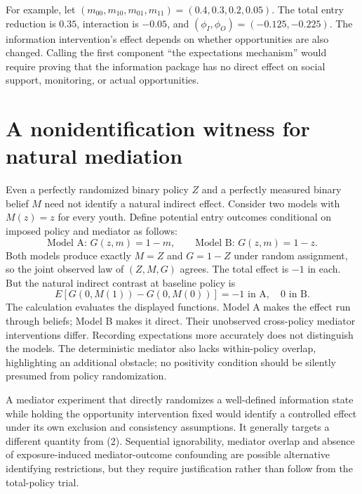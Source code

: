 \documentclass[11pt,a4paper]{article}
\begin{document}
For example, let $(m_{00},m_{10},m_{01},m_{11})=(0.4,0.3,0.2,0.05)$. The total entry reduction is $0.35$, interaction is $-0.05$, and $(\phi_I,\phi_O)=(-0.125,-0.225)$. The information intervention's effect depends on whether opportunities are also changed. Calling the first component ``the expectations mechanism'' would require proving that the information package has no direct effect on social support, monitoring, or actual opportunities.

\section{A nonidentification witness for natural mediation}
Even a perfectly randomized binary policy $Z$ and a perfectly measured binary belief $M$ need not identify a natural indirect effect. Consider two models with $M(z)=z$ for every youth. Define potential entry outcomes conditional on imposed policy and mediator as follows:
\[
 \text{Model A: }G(z,m)=1-m,\qquad
 \text{Model B: }G(z,m)=1-z.
\]
Both models produce exactly $M=Z$ and $G=1-Z$ under random assignment, so the joint observed law of $(Z,M,G)$ agrees. The total effect is $-1$ in each. But the natural indirect contrast at baseline policy is
\[
 E[G(0,M(1))-G(0,M(0))]=-1\text{ in A},\quad0\text{ in B}. \tag{2}
\]
The calculation evaluates the displayed functions. Model A makes the effect run through beliefs; Model B makes it direct. Their unobserved cross-policy mediator interventions differ. Recording expectations more accurately does not distinguish the models. The deterministic mediator also lacks within-policy overlap, highlighting an additional obstacle; no positivity condition should be silently presumed from policy randomization.

A mediator experiment that directly randomizes a well-defined information state while holding the opportunity intervention fixed would identify a controlled effect under its own exclusion and consistency assumptions. It generally targets a different quantity from (2). Sequential ignorability, mediator overlap and absence of exposure-induced mediator-outcome confounding are possible alternative identifying restrictions, but they require justification rather than follow from the total-policy trial.
\end{document}
